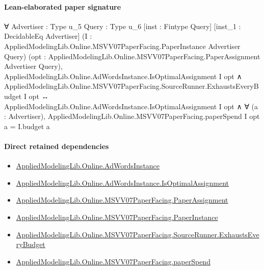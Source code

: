 \documentclass[10pt]{article}
\begin{document}
\paragraph{Lean-elaborated paper signature}
\begin{ReviewVerbatim}
∀ {Advertiser : Type u_5} {Query : Type u_6} [inst : Fintype Query] [inst_1 : DecidableEq Advertiser]
  (I : AppliedModelingLib.Online.MSVV07PaperFacing.PaperInstance Advertiser Query)
  (opt : AppliedModelingLib.Online.MSVV07PaperFacing.PaperAssignment Advertiser Query),
  AppliedModelingLib.Online.AdWordsInstance.IsOptimalAssignment I opt ∧
      AppliedModelingLib.Online.MSVV07PaperFacing.SourceRunner.ExhaustsEveryBudget I opt ↔
    AppliedModelingLib.Online.AdWordsInstance.IsOptimalAssignment I opt ∧
      ∀ (a : Advertiser), AppliedModelingLib.Online.MSVV07PaperFacing.paperSpend I opt a = I.budget a
\end{ReviewVerbatim}

\paragraph{Direct retained dependencies}
\begin{itemize}\raggedright
\item \hyperlink{governing-declaration-e5ce49672bf26ab1}{Applied\allowbreak{}Modeling\allowbreak{}Lib.\allowbreak{}Online.\allowbreak{}Ad\allowbreak{}Words\allowbreak{}Instance}
\item \hyperlink{governing-declaration-d879bda36a6e6f63}{Applied\allowbreak{}Modeling\allowbreak{}Lib.\allowbreak{}Online.\allowbreak{}Ad\allowbreak{}Words\allowbreak{}Instance.\allowbreak{}Is\allowbreak{}Optimal\allowbreak{}Assignment}
\item \hyperlink{governing-declaration-66366495aae29a76}{Applied\allowbreak{}Modeling\allowbreak{}Lib.\allowbreak{}Online.\allowbreak{}MSVV07\allowbreak{}Paper\allowbreak{}Facing.\allowbreak{}Paper\allowbreak{}Assignment}
\item \hyperlink{governing-declaration-11907576ec71eeb5}{Applied\allowbreak{}Modeling\allowbreak{}Lib.\allowbreak{}Online.\allowbreak{}MSVV07\allowbreak{}Paper\allowbreak{}Facing.\allowbreak{}Paper\allowbreak{}Instance}
\item \hyperlink{governing-declaration-951f23f825323feb}{Applied\allowbreak{}Modeling\allowbreak{}Lib.\allowbreak{}Online.\allowbreak{}MSVV07\allowbreak{}Paper\allowbreak{}Facing.\allowbreak{}Source\allowbreak{}Runner.\allowbreak{}Exhausts\allowbreak{}Every\allowbreak{}Budget}
\item \hyperlink{governing-declaration-5457fe1cc0e99856}{Applied\allowbreak{}Modeling\allowbreak{}Lib.\allowbreak{}Online.\allowbreak{}MSVV07\allowbreak{}Paper\allowbreak{}Facing.\allowbreak{}paper\allowbreak{}Spend}
\end{itemize}
\end{document}
